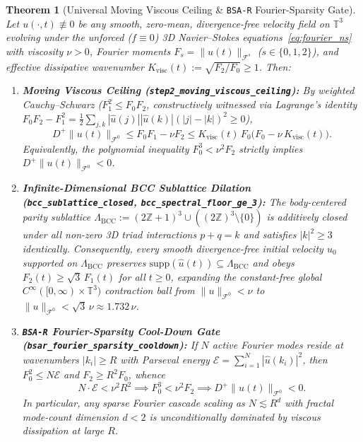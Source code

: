 \documentclass[11pt]{article}
\theoremstyle{plain}
\newtheorem{theorem}{Theorem}[section]
\theoremstyle{definition}
\begin{document}
\begin{theorem}[Universal Moving Viscous Ceiling \& \texttt{BSA-R} Fourier-Sparsity Gate]\label{thm:step2}
Let $u(\cdot,t) \not\equiv 0$ be any smooth, zero-mean, divergence-free velocity field on $\mathbb{T}^3$ evolving under the unforced ($f \equiv 0$) 3D Navier--Stokes equations~\eqref{eq:fourier_ns} with viscosity $\nu > 0$, Fourier moments $F_s = \|u(t)\|_{\mathcal{F}^s}$ ($s \in \{0,1,2\}$), and effective dissipative wavenumber $K_{\mathrm{visc}}(t) := \sqrt{F_2 / F_0} \ge 1$. Then:
\begin{enumerate}
  \item \textbf{Moving Viscous Ceiling (\texttt{step2\_moving\_viscous\_ceiling}):} By weighted Cauchy--Schwarz ($F_1^2 \le F_0 F_2$, constructively witnessed via Lagrange's identity $F_0 F_2 - F_1^2 = \frac{1}{2}\sum_{j,k} |\hat{u}(j)||\hat{u}(k)|(|j|-|k|)^2 \ge 0$),
  \begin{equation}\label{eq:moving_ceiling}
    D^+\|u(t)\|_{\mathcal{F}^0} \le F_0 F_1 - \nu F_2 \le K_{\mathrm{visc}}(t)\,F_0\Big(F_0 - \nu\,K_{\mathrm{visc}}(t)\Big).
  \end{equation}
  Equivalently, the polynomial inequality $F_0^3 < \nu^2 F_2$ strictly implies $D^+\|u(t)\|_{\mathcal{F}^0} < 0$.
  \item \textbf{Infinite-Dimensional BCC Sublattice Dilation (\texttt{bcc\_sublattice\_closed}, \texttt{bcc\_\allowbreak spectral\_floor\_ge\_3}):} The body-centered parity sublattice $\Lambda_{\mathrm{BCC}} := (2\mathbb{Z}+1)^3 \cup ((2\mathbb{Z})^3 \setminus \{0\})$ is additively closed under all non-zero 3D triad interactions $p + q = k$ and satisfies $|k|^2 \ge 3$ identically. Consequently, every smooth divergence-free initial velocity $u_0$ supported on $\Lambda_{\mathrm{BCC}}$ preserves $\mathrm{supp}(\hat{u}(t)) \subseteq \Lambda_{\mathrm{BCC}}$ and obeys $F_2(t) \ge \sqrt{3}\,F_1(t)$ for all $t \ge 0$, expanding the constant-free global $C^\infty([0,\infty)\times\mathbb{T}^3)$ contraction ball from $\|u\|_{\mathcal{F}^0} < \nu$ to $\|u\|_{\mathcal{F}^0} < \sqrt{3}\,\nu \approx 1.732\,\nu$.
  \item \textbf{\texttt{BSA-R} Fourier-Sparsity Cool-Down Gate (\texttt{bsar\_fourier\_sparsity\_cooldown}):} If $N$ active Fourier modes reside at wavenumbers $|k_i| \ge R$ with Parseval energy $\mathcal{E} = \sum_{i=1}^N |\hat{u}(k_i)|^2$, then $F_0^2 \le N\mathcal{E}$ and $F_2 \ge R^2 F_0$, whence
  \begin{equation}\label{eq:sparsity_gate}
    N \cdot \mathcal{E} < \nu^2 R^2 \implies F_0^3 < \nu^2 F_2 \implies D^+\|u(t)\|_{\mathcal{F}^0} < 0.
  \end{equation}
  In particular, any sparse Fourier cascade scaling as $N \lesssim R^d$ with fractal mode-count dimension $d < 2$ is unconditionally dominated by viscous dissipation at large $R$.
\end{enumerate}
\end{theorem}
\end{document}
